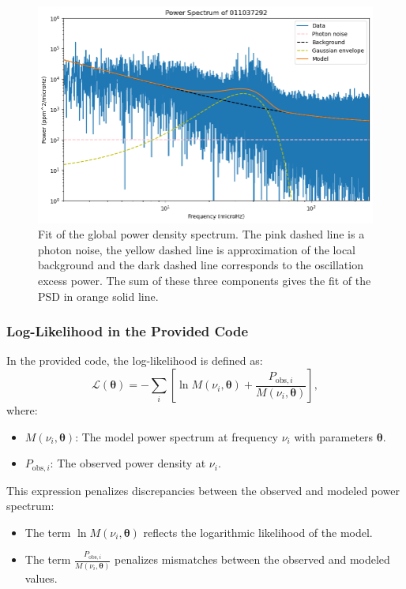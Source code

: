 \documentclass[12pt]{article}
\begin{document}
\begin{figure}[H]
  \centering
  \includegraphics[width=\linewidth]{fit_powerExcess.png}
  \caption{Fit of the global power density spectrum. The pink dashed line is
a photon noise, the yellow dashed line is approximation of the local background and the dark dashed line corresponds to the oscillation excess power. The sum of these three components gives the fit of the PSD in orange solid line.}
  \label{fig:fit_powerExcess}
\end{figure}

\subsubsection*{Log-Likelihood in the Provided Code}
In the provided code, the log-likelihood is defined as:
\[
\mathcal{L}(\boldsymbol{\theta}) = - \sum_i \left[ \ln M(\nu_i, \boldsymbol{\theta}) + \frac{P_{\text{obs},i}}{M(\nu_i, \boldsymbol{\theta})} \right],
\]
where:
\begin{itemize}
    \item $M(\nu_i, \boldsymbol{\theta})$: The model power spectrum at frequency $\nu_i$ with parameters $\boldsymbol{\theta}$.
    \item $P_{\text{obs},i}$: The observed power density at $\nu_i$.
\end{itemize}

This expression penalizes discrepancies between the observed and modeled power spectrum:
\begin{itemize}
    \item The term $\ln M(\nu_i, \boldsymbol{\theta})$ reflects the logarithmic likelihood of the model.
    \item The term $\frac{P_{\text{obs},i}}{M(\nu_i, \boldsymbol{\theta})}$ penalizes mismatches between the observed and modeled values.
\end{itemize}
\end{document}
